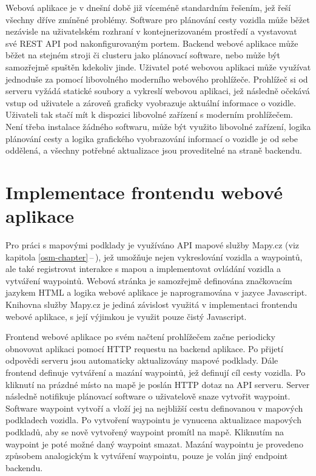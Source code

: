 \documentclass[czech, bachelor]{diploma}
\newcommand{\peteref}[1]{\ref{#1}\,--\,\nameref{#1}}
\begin{document}
Webová aplikace je v dnešní době již víceméně standardním řešením, jež řeší všechny dříve zmíněné problémy. Software pro plánování
cesty vozidla může běžet nezávisle na uživatelském rozhraní v kontejnerizovaném prostředí a vystavovat své REST API
pod nakonfigurovaným portem. Backend webové aplikace může běžet na stejném stroji či clusteru jako plánovací software, nebo může
být samozřejmě spuštěn kdekoliv jinde. Uživatel poté webovou aplikaci může využívat jednoduše za pomocí libovolného moderního
webového prohlížeče. Prohlížeč si od serveru vyžádá statické soubory a vykreslí webovou aplikaci, jež následně očekává vstup
od uživatele a zároveň graficky vyobrazuje aktuální informace o vozidle. Uživateli tak stačí mít k dispozici libovolné zařízení
s moderním prohlížečem. Není třeba instalace žádného softwaru, může být využito libovolné zařízení, logika plánování cesty
a logika grafického vyobrazování informací o vozidle je od sebe oddělená, a všechny potřebné aktualizace jsou proveditelné
na straně backendu.

\section{Implementace frontendu webové aplikace}

Pro práci s mapovými podklady je využíváno API mapové služby Mapy.cz \cite{mapycz-source} (viz kapitola \peteref{osm-chapter}),
jež umožňuje nejen vykreslování vozidla a waypointů, ale také registrovat interakce s mapou a implementovat ovládání vozidla
a vytváření waypointů. Webová stránka je samozřejmě definována značkovacím jazykem HTML a logika webové aplikace je
naprogramována v jazyce Javascript. Knihovna služby Mapy.cz je jediná závislost využitá v implementaci frontendu webové aplikace,
s její výjimkou je využit pouze čistý Javascript.

Frontend webové aplikace po svém načtení prohlížečem začne periodicky obnovovat aplikaci pomocí HTTP requestu na backend aplikace.
Po přijetí odpovědi serveru jsou automaticky aktualizovány mapové podklady. Dále frontend definuje vytváření a mazání waypointů,
jež definují cíl cesty vozidla. Po kliknutí na prázdné místo na mapě je poslán HTTP dotaz na API serveru. Server následně
notifikuje plánovací software o uživatelově snaze vytvořit waypoint. Software waypoint vytvoří a vloží jej na nejbližší cestu
definovanou v mapových podkladech vozidla. Po vytvoření waypointu je vynucena aktualizace mapových podkladů, aby se nově vytvořený
waypoint promítl na mapě. Kliknutím na waypoint je poté možné daný waypoint smazat. Mazání waypointu je provedeno způsobem
analogickým k vytváření waypointu, pouze je volán jiný endpoint backendu.
\end{document}
